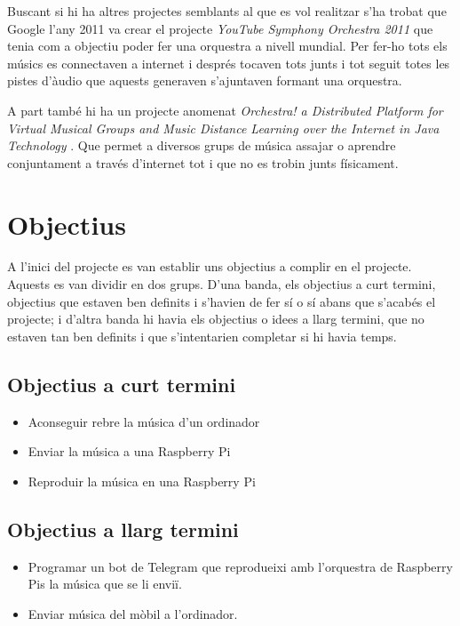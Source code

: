 \documentclass[a4paper]{paper}
\let\oldsection\section
\renewcommand\section{\clearpage\oldsection}
\begin{document}
Buscant si hi ha altres projectes semblants al que es vol realitzar s'ha trobat que Google l'any 2011 va crear el projecte \emph{YouTube Symphony Orchestra 2011}\cite{YoutubeSymphoni} que tenia com a objectiu poder fer una orquestra a nivell mundial. Per fer-ho tots els músics es connectaven a internet i després tocaven tots junts i tot seguit totes les pistes d'àudio que aquests generaven s'ajuntaven formant una orquestra.

A part també hi ha un projecte anomenat \emph{Orchestra! a Distributed Platform for Virtual Musical Groups and Music Distance Learning over the Internet in Java \texttrademark Technology} \cite{Orchestra}. Que permet a diversos grups de música assajar o aprendre conjuntament a través d'internet tot i que no es trobin junts físicament.

\section{Objectius}
A l'inici del projecte es van establir uns objectius a complir en el projecte. Aquests es van dividir en dos grups. D'una banda, els objectius a curt termini, objectius que estaven ben definits i s'havien de fer sí o sí abans que s'acabés el projecte; i d'altra banda hi havia els objectius o idees a llarg termini, que no estaven tan ben definits i que s'intentarien completar si hi havia temps.

\subsection{Objectius a curt termini}
\begin{itemize}
	\item Aconseguir rebre la música d'un ordinador
	\item Enviar la música a una Raspberry Pi
	\item Reproduir la música en una Raspberry Pi
\end{itemize}

\subsection{Objectius a llarg termini}
\begin{itemize}
	\item Programar un bot de Telegram que reprodueixi amb l'orquestra de Raspberry Pis la música que se li enviï.
	\item Enviar música del mòbil a l'ordinador.
\end{itemize}
\end{document}
